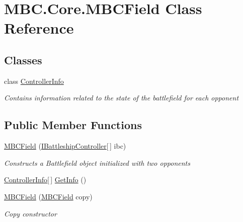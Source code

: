 \hypertarget{class_m_b_c_1_1_core_1_1_m_b_c_field}{\section{M\-B\-C.\-Core.\-M\-B\-C\-Field Class Reference}
\label{class_m_b_c_1_1_core_1_1_m_b_c_field}
}
\subsection*{Classes}
\begin{DoxyCompactItemize}
\item 
class \hyperlink{class_m_b_c_1_1_core_1_1_m_b_c_field_1_1_controller_info}{Controller\-Info}
\begin{DoxyCompactList}\small\item\em Contains information related to the state of the battlefield for each opponent\end{DoxyCompactList}\end{DoxyCompactItemize}
\subsection*{Public Member Functions}
\begin{DoxyCompactItemize}
\item 
\hypertarget{class_m_b_c_1_1_core_1_1_m_b_c_field_ad2ed8a524db91a0438b2c24d2d4e3c00}{\hyperlink{class_m_b_c_1_1_core_1_1_m_b_c_field_ad2ed8a524db91a0438b2c24d2d4e3c00}{M\-B\-C\-Field} (\hyperlink{interface_m_b_c_1_1_core_1_1_i_battleship_controller}{I\-Battleship\-Controller}\mbox{[}$\,$\mbox{]} ibc)}\label{class_m_b_c_1_1_core_1_1_m_b_c_field_ad2ed8a524db91a0438b2c24d2d4e3c00}

\begin{DoxyCompactList}\small\item\em Constructs a Battlefield object initialized with two opponents\end{DoxyCompactList}\item 
\hyperlink{class_m_b_c_1_1_core_1_1_m_b_c_field_1_1_controller_info}{Controller\-Info}\mbox{[}$\,$\mbox{]} \hyperlink{class_m_b_c_1_1_core_1_1_m_b_c_field_ac9c0628a7e171104ebe89d63d29b4227}{Get\-Info} ()
\item 
\hypertarget{class_m_b_c_1_1_core_1_1_m_b_c_field_acd47fe42ac6feb7c4ee1573852a14a0b}{\hyperlink{class_m_b_c_1_1_core_1_1_m_b_c_field_acd47fe42ac6feb7c4ee1573852a14a0b}{M\-B\-C\-Field} (\hyperlink{class_m_b_c_1_1_core_1_1_m_b_c_field}{M\-B\-C\-Field} copy)}\label{class_m_b_c_1_1_core_1_1_m_b_c_field_acd47fe42ac6feb7c4ee1573852a14a0b}

\begin{DoxyCompactList}\small\item\em Copy constructor\end{DoxyCompactList}\end{DoxyCompactItemize}
